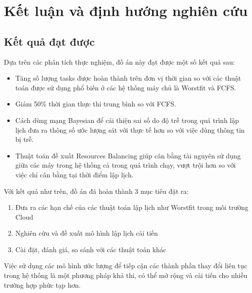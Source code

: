 \documentclass{my_style}
\begin{document}
\newpage 
\chapter{Kết luận và định hướng nghiên cứu}
\label{Conclusion}
\section{Kết quả đạt được}
Dựa trên các phân tích thực nghiệm, đồ án này đạt được một số kết quả sau: 
\begin{itemize}
	\item Tăng số lượng tasks được hoàn thành trên đơn vị thời gian so với các thuật toán được sử dụng phổ biến ở các hệ thống máy chủ là Worstfit và FCFS.
	\item Giảm 50\% thời gian thực thi trung bình so với FCFS. 
	\item Cách dùng mạng Bayesian để cải thiện sai số do độ trễ trong quá trình lập lịch đưa ra thông số ước lượng sát với thực tế hơn so với việc dùng thông tin bị trễ. 
	\item Thuật toán đề xuất Resources Balancing giúp cân bằng tài nguyên sử dụng giữa các máy trong hệ thống cả trong quá trình chạy, vượt trội hơn so với việc chỉ cân bằng tại thời điểm lập lịch. 
\end{itemize}
Với kết quả như trên, đồ án đã hoàn thành 3 mục tiêu đặt ra: 
\begin{enumerate}
	\item Đưa ra các hạn chế của các thuật toán lập lịch như Worstfit trong môi trường Cloud 
	\item Nghiên cứu và đề xuất mô hình lập lịch cải tiến 
	\item Cài đặt, đánh giá, so sánh với các thuật toán khác 
\end{enumerate}
Việc sử dụng các mô hình ước lượng để tiếp cận các thành phần thay đổi liên tục trong hệ thống là một phương pháp khả thi, có thể mở rộng và cải tiến cho nhiều trường hợp phức tạp hơn. 
\end{document}
